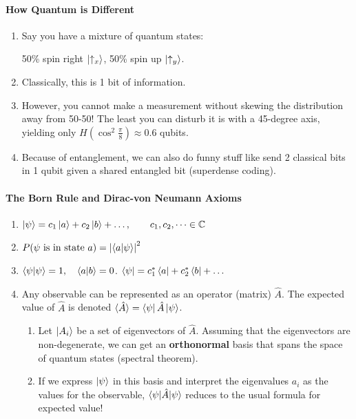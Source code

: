 \documentclass[12pt]{article}
\theoremstyle{remark}
\begin{document}
\paragraph{How Quantum is Different}
\begin{enumerate}
    \item Say you have a mixture of quantum states:
    
    50\% spin right $\ket{\uparrow_x}$, 50\% spin up $\ket{\uparrow_y}$.
    \item Classically, this is 1 bit of information.
    \item However, you cannot make a measurement without skewing the distribution away from 50-50! The least you can disturb it is with a 45-degree axis, yielding only $H(\cos^2\frac{\pi}{8})\approx0.6$ qubits. 

    \item Because of entanglement, we can also do funny stuff like send 2 classical bits in 1 qubit given a shared entangled bit (superdense coding).
\end{enumerate}

\paragraph{The Born Rule and Dirac-von Neumann Axioms}
\begin{enumerate}
\item $\ket{\psi} = c_1 \ket{a} + c_2 \ket{b} + \dots,\qquad c_1,c_2,\dots\in\mathbb{C}$
\item $P(\psi\text{ is in state }a)= \left\lvert\braket{a|\psi}\right\rvert^2$
\item $\braket{\psi|\psi} = 1, \quad \braket{a|b} = 0$. \qquad $\bra{\psi} = c_1^\ast \bra{a} + c_2^\ast \bra{b} + \dots$

\item Any observable can be represented as an operator (matrix) $\hat A$. The expected value of $\hat A$ is denoted
$\braket{\hat A} = \bra{\psi}\hat A\ket{\psi}$.

\begin{enumerate}
    \item Let $\ket{A_i}$ be a set of eigenvectors of $\hat A$. Assuming that the eigenvectors are non-degenerate, we can get an \textbf{orthonormal} basis that spans the space of quantum states (spectral theorem).
    
    \item If we express $\ket{\psi}$ in this basis and interpret the eigenvalues $a_i$ as the values for the observable, $\braket{\psi | \hat A |\psi}$ reduces to the usual formula for expected value! 
\end{enumerate}
\end{enumerate}
\end{document}
